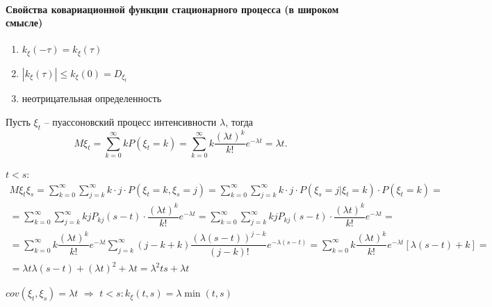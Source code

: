 \paragraph{Свойства ковариационной функции стационарного процесса (в широком смысле)}

\begin{enumerate}
  \item $k_\xi(-\tau) = k_\xi (\tau)$
  \item $|k_\xi(\tau)| \leqslant k_\xi(0) = D_{\xi_t}$
  \item неотрицательная определенность
\end{enumerate}

\begin{ex}
  Пусть $\xi_t$ -- пуассоновский процесс интенсивности $\lambda$, тогда
  \[
    M\xi_t = \sum_{k=0}^\infty k P(\xi_t = k) = \sum_{k=0}^\infty k \dfrac{(\lambda t)^k}{k!} e^{-\lambda t} = \lambda t.
  \]

  $t<s$:
  \begin{multline*}
    M\xi_t \xi_s = \sum_{k=0}^\infty \sum_{j=k}^\infty k\cdot j \cdot P(\xi_t = k, \xi_s = j)
    = \sum_{k=0}^\infty \sum_{j=k}^\infty k \cdot j \cdot P(\xi_s=j | \xi_t=k) \cdot P(\xi_t = k) = \\
    = \sum_{k=0}^\infty \sum_{j=k}^\infty kj P_{kj}(s-t) \cdot \dfrac{(\lambda t)^k}{k!} e^{-\lambda t}
    = \sum_{k=0}^\infty \sum_{j=k}^\infty kj P_{kj}(s-t) \cdot \dfrac{(\lambda t)^k}{k!} e^{-\lambda t} = \\
    = \sum_{k=0}^\infty k \dfrac{(\lambda t)^k}{k!} e^{-\lambda t}
    \sum_{j=k}^\infty (j-k+k) \dfrac{(\lambda(s-t))^{j-k}}{(j-k)!} e^{- \lambda (s-t)}
    = \sum_{k=0}^\infty k \dfrac{(\lambda t)^k}{k!} e^{-\lambda t} [\lambda(s-t) + k] = \\
    = \lambda t \lambda (s-t) + (\lambda t)^2 + \lambda t = \lambda^2 t s + \lambda t
  \end{multline*}

  $cov(\xi_t, \xi_s) = \lambda t$ $\Rightarrow$ $t < s : k_\xi (t, s) = \lambda \min(t, s)$
\end{ex}
